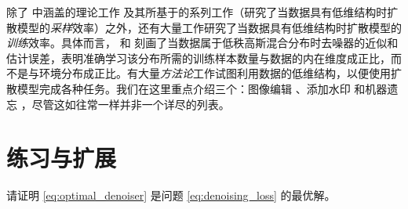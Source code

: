 \documentclass[../../book-main_zh.tex]{subfiles}
\begin{document}
除了  中涵盖的理论工作 \citep{li2024d} 及其所基于的系列工作（研究了当数据具有低维结构时扩散模型的\textit{采样}效率）之外，还有大量工作研究了当数据具有低维结构时扩散模型的\textit{训练}效率。具体而言，\citet{chen2023score} 和 \citep{wang2024diffusion} 刻画了当数据属于低秩高斯混合分布时去噪器的近似和估计误差，表明准确学习该分布所需的训练样本数量与数据的内在维度成正比，而不是与环境分布成正比。有大量\textit{方法论}工作试图利用数据的低维结构，以便使用扩散模型完成各种任务。我们在这里重点介绍三个：图像编辑 \citep{chen2024exploring}、添加水印 \citep{li2024shallow} 和机器遗忘 \citep{chen2025dual}，尽管这如往常一样并非一个详尽的列表。

\section{练习与扩展}

\begin{exercise}
    请证明 \eqref{eq:optimal_denoiser} 是问题 \eqref{eq:denoising_loss} 的最优解。
\end{exercise}
\end{document}
